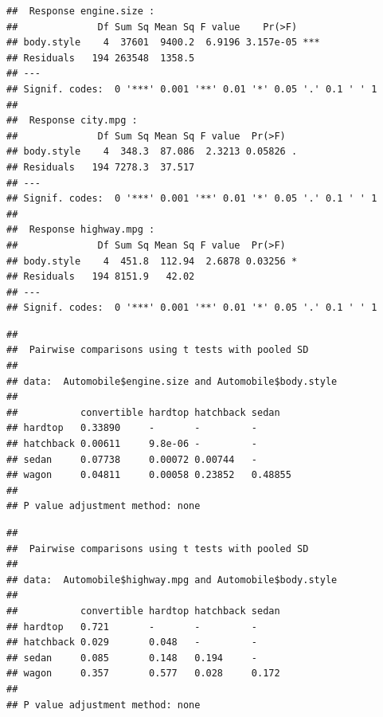 \documentclass[]{article}
\newenvironment{Shaded}{\begin{snugshade}}{\end{snugshade}}
\newcommand{\KeywordTok}[1]{\textcolor[rgb]{0.13,0.29,0.53}{\textbf{#1}}}
\newcommand{\DataTypeTok}[1]{\textcolor[rgb]{0.13,0.29,0.53}{#1}}
\newcommand{\StringTok}[1]{\textcolor[rgb]{0.31,0.60,0.02}{#1}}
\newcommand{\OperatorTok}[1]{\textcolor[rgb]{0.81,0.36,0.00}{\textbf{#1}}}
\newcommand{\NormalTok}[1]{#1}
\begin{document}
\begin{verbatim}
##  Response engine.size :
##              Df Sum Sq Mean Sq F value    Pr(>F)    
## body.style    4  37601  9400.2  6.9196 3.157e-05 ***
## Residuals   194 263548  1358.5                      
## ---
## Signif. codes:  0 '***' 0.001 '**' 0.01 '*' 0.05 '.' 0.1 ' ' 1
## 
##  Response city.mpg :
##              Df Sum Sq Mean Sq F value  Pr(>F)  
## body.style    4  348.3  87.086  2.3213 0.05826 .
## Residuals   194 7278.3  37.517                  
## ---
## Signif. codes:  0 '***' 0.001 '**' 0.01 '*' 0.05 '.' 0.1 ' ' 1
## 
##  Response highway.mpg :
##              Df Sum Sq Mean Sq F value  Pr(>F)  
## body.style    4  451.8  112.94  2.6878 0.03256 *
## Residuals   194 8151.9   42.02                  
## ---
## Signif. codes:  0 '***' 0.001 '**' 0.01 '*' 0.05 '.' 0.1 ' ' 1
\end{verbatim}

\begin{Shaded}
\end{Shaded}

\begin{verbatim}
## 
##  Pairwise comparisons using t tests with pooled SD 
## 
## data:  Automobile$engine.size and Automobile$body.style 
## 
##           convertible hardtop hatchback sedan  
## hardtop   0.33890     -       -         -      
## hatchback 0.00611     9.8e-06 -         -      
## sedan     0.07738     0.00072 0.00744   -      
## wagon     0.04811     0.00058 0.23852   0.48855
## 
## P value adjustment method: none
\end{verbatim}

\begin{Shaded}
\end{Shaded}

\begin{verbatim}
## 
##  Pairwise comparisons using t tests with pooled SD 
## 
## data:  Automobile$highway.mpg and Automobile$body.style 
## 
##           convertible hardtop hatchback sedan
## hardtop   0.721       -       -         -    
## hatchback 0.029       0.048   -         -    
## sedan     0.085       0.148   0.194     -    
## wagon     0.357       0.577   0.028     0.172
## 
## P value adjustment method: none
\end{verbatim}
\end{document}
